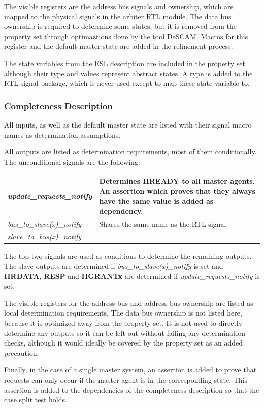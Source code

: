 The visible registers are the address bus signals and ownership, which are mapped to the physical signals in the arbiter RTL module. The data bus ownership is required to determine some states, but it is removed from the property set through optimaztions done by the tool DeSCAM. Macros for this register and the default master state are added in the refinement process. \par
The state variables from the ESL description are included in the property set although their type and values represent abstract states. A type is added to the RTL signal package, which is never used except to map these state variable to. 


\subsubsection{Completeness Description}
All inputs, as well as the default master state are listed with their signal macro names as determination assumptions. \par
All outputs are listed as determination requirements, most of them conditionally. The unconditional signals are the following: \\

\begin{tabular}{p{4.3cm} | p{10cm}}
\textit{update\_requests\_notify} & Determines \textbf{HREADY} to all master agents. An assertion which proves that they always have the same value is added as dependency. \\
\hline
\textit{bus\_to\_slave(x)\_notify} & Shares the same name as the RTL signal \\
\textit{slave\_to\_bus(x)\_notify} &  \\
\end{tabular}

The top two signals are used as conditions to determine the remaining outputs. The slave outputs are determined if \textit{bus\_to\_slave(x)\_notify} is set and \textbf{HRDATA}, \textbf{RESP} and \textbf{HGRANTx} are determined if \textit{update\_requests\_notify} is set. \par

The visible registers for the address bus and address bus ownership are listed as local determination requirements. The data bus ownership is not listed here, because it is optimized away from the property set. It is not used to directly determine any outputs so it can be left out without failing any determination checks, although it would ideally be covered by the property set as an added precaution. \par
Finally, in the case of a single master system, an assertion is added to prove that requests can only occur if the master agent is in the corresponding state. This assertion is added to the dependencies of the completeness description so that the case split test holds. 

